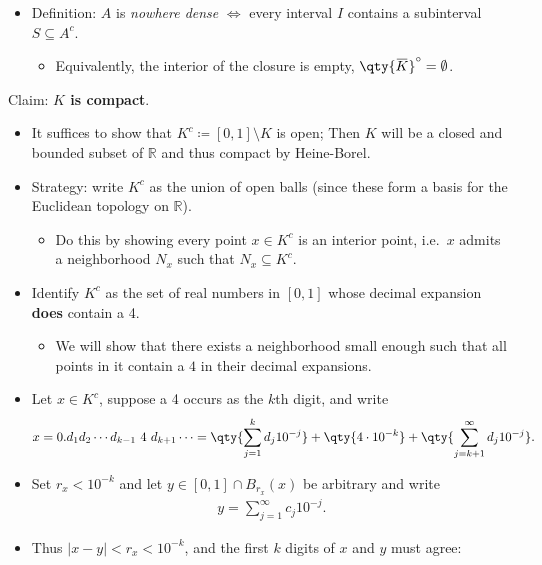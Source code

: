 \begin{solution}

\hfill

\begin{concept}

\hfill

\begin{itemize}
\tightlist
\item
  Definition: \(A\) is \emph{nowhere dense} \(\iff\) every interval
  \(I\) contains a subinterval \(S \subseteq A^c\).

  \begin{itemize}
  \tightlist
  \item
    Equivalently, the interior of the closure is empty,
    \(\qty{\mkern 1.5mu\overline{\mkern-1.5muK\mkern-1.5mu}\mkern 1.5mu}^\circ = \emptyset\).
  \end{itemize}
\end{itemize}

\end{concept}

Claim: \textbf{\(K\) is compact}.

\begin{itemize}
\item
  It suffices to show that \(K^c \coloneqq[0, 1]\setminus K\) is open;
  Then \(K\) will be a closed and bounded subset of \({\mathbb{R}}\) and
  thus compact by Heine-Borel.
\item
  Strategy: write \(K^c\) as the union of open balls (since these form a
  basis for the Euclidean topology on \({\mathbb{R}}\)).

  \begin{itemize}
  \tightlist
  \item
    Do this by showing every point \(x\in K^c\) is an interior point,
    i.e.~\(x\) admits a neighborhood \(N_x\) such that
    \(N_x \subseteq K^c\).
  \end{itemize}
\item
  Identify \(K^c\) as the set of real numbers in \([0, 1]\) whose
  decimal expansion \textbf{does} contain a 4.

  \begin{itemize}
  \tightlist
  \item
    We will show that there exists a neighborhood small enough such that
    all points in it contain a \(4\) in their decimal expansions.
  \end{itemize}
\item
  Let \(x\in K^c\), suppose a 4 occurs as the \(k\)th digit, and write
  \begin{align*}  
  x = 0.d_1 d_2 \cdots d_{k-1}~ 4 ~d_{k+1}\cdots 
  = \qty{\sum_{j=1}^k d_j 10^{-j}} + \qty{4\cdot 10^{-k}} + \qty{\sum_{j=k+1}^\infty d_j 10^{-j}}
  .\end{align*}
\item
  Set \(r_x < 10^{-k}\) and let \(y \in [0, 1] \cap B_{r_x}(x)\) be
  arbitrary and write
  \begin{align*}  
  y = \sum_{j=1}^\infty c_j 10^{-j}
  .\end{align*}
\item
  Thus \({\left\lvert {x-y} \right\rvert} < r_x < 10^{-k}\), and the
  first \(k\) digits of \(x\) and \(y\) must agree:


\end{itemize}
\end{solution}
